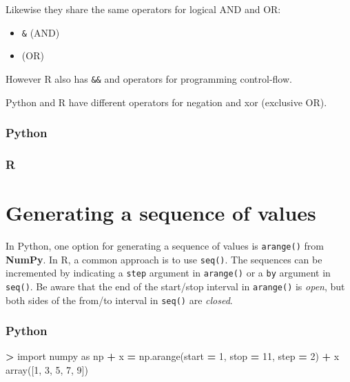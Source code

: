 \documentclass[
]{book}
\newenvironment{Shaded}{\begin{snugshade}}{\end{snugshade}}
\newcommand{\DecValTok}[1]{\textcolor[rgb]{0.00,0.00,0.81}{#1}}
\newcommand{\ImportTok}[1]{#1}
\newcommand{\NormalTok}[1]{#1}
\newcommand{\OperatorTok}[1]{\textcolor[rgb]{0.81,0.36,0.00}{\textbf{#1}}}
\providecommand{\tightlist}{%
  \setlength{\itemsep}{0pt}\setlength{\parskip}{0pt}}
\begin{document}
Likewise they share the same operators for logical AND and OR:

\begin{itemize}
\tightlist
\item
  \texttt{\&} (AND)
\item
  \texttt{\textbar{}} (OR)
\end{itemize}

However R also has \texttt{\&\&} and \texttt{\textbar{}\textbar{}} operators for programming control-flow.

Python and R have different operators for negation and xor (exclusive OR).

\hypertarget{python-4}{%
\subsubsection*{Python}\label{python-4}}

\hypertarget{r-4}{%
\subsubsection*{R}\label{r-4}}

\hypertarget{generating-a-sequence-of-values}{%
\section{Generating a sequence of values}\label{generating-a-sequence-of-values}}

In Python, one option for generating a sequence of values is \texttt{arange()} from \textbf{NumPy}. In R, a common approach is to use \texttt{seq()}. The sequences can be incremented by indicating a \texttt{step} argument in \texttt{arange()} or a \texttt{by} argument in \texttt{seq()}. Be aware that the end of the start/stop interval in \texttt{arange()} is \emph{open}, but both sides of the from/to interval in \texttt{seq()} are \emph{closed}.

\hypertarget{python-5}{%
\subsubsection*{Python}\label{python-5}}

\begin{Shaded}
\begin{Highlighting}[]
\OperatorTok{\textgreater{}} \ImportTok{import}\NormalTok{ numpy }\ImportTok{as}\NormalTok{ np}
\OperatorTok{+}\NormalTok{ x }\OperatorTok{=}\NormalTok{ np.arange(start }\OperatorTok{=} \DecValTok{1}\NormalTok{, stop }\OperatorTok{=} \DecValTok{11}\NormalTok{, step }\OperatorTok{=} \DecValTok{2}\NormalTok{)}
\OperatorTok{+}\NormalTok{ x}
\NormalTok{array([}\DecValTok{1}\NormalTok{, }\DecValTok{3}\NormalTok{, }\DecValTok{5}\NormalTok{, }\DecValTok{7}\NormalTok{, }\DecValTok{9}\NormalTok{])}
\end{Highlighting}
\end{Shaded}
\end{document}

